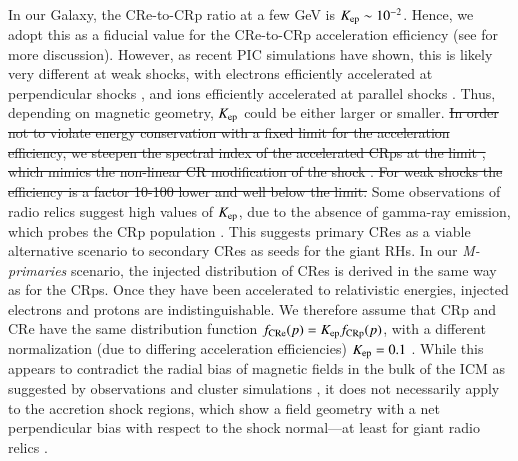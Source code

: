 \documentclass[a4paper,fleqn,usenatbib]{mnras}
\begin{document}
In our Galaxy, the CRe-to-CRp ratio at a few GeV is $K_{{\mathrm{ep}}} \sim
10^{-2}$. Hence, we adopt this as a fiducial value for the CRe-to-CRp
acceleration efficiency (see \cite{pinzke13} for more
discussion). However, as recent PIC simulations have shown, this is
likely very different at weak shocks, with electrons efficiently
accelerated at perpendicular shocks
\citep{2014ApJ...794..153G,2014ApJ...797...47G}, and ions efficiently
accelerated at parallel shocks \citep{2014ApJ...783...91C}. Thus,
depending on magnetic geometry, $K_{{\mathrm{ep}}}$ could be either larger
or smaller. \sout{In order not to violate energy conservation with a
  fixed limit for the acceleration efficiency, we steepen the spectral
  index of the accelerated CRps at the limit %
, which  mimics the non-linear CR modification of the shock
  . For weak shocks the efficiency is a factor 10-100
  lower and well below the limit.} Some observations of radio relics
suggest high values of $K_{{\mathrm{ep}}}$, due to the absence of gamma-ray
emission, which probes the CRp population
\citep{2014MNRAS.437.2291V}. This suggests primary CRes as a viable
alternative scenario to secondary CRes as seeds for the giant RHs. In
our {\em M-primaries} scenario, the injected distribution of CRes is
derived in the same way as for the CRps. Once they have been
accelerated to relativistic energies, injected electrons and protons
are indistinguishable. We therefore assume that CRp and CRe have the
same distribution function $f_{\mathrm{CRe}}(p) = K_{\mathrm{ep}}
f_{\mathrm{CRp}}(p)$, with a different normalization (due to differing
acceleration efficiencies) $K_{\mathrm{ep}}=0.1$ \citep[which is viable for
  primarily perpendicular shocks][]{2014ApJ...794..153G}. While this
appears to contradict the radial bias of magnetic fields in the bulk
of the ICM as suggested by observations \citep{2010NatPh...6..520P}
and cluster simulations \citep{2011ApJ...740...81R}, it does not
necessarily apply to the accretion shock regions, which show a field
geometry with a net perpendicular bias with respect to the shock
normal---at least for giant radio relics \citep{2010Sci...330..347V}.
\end{document}
